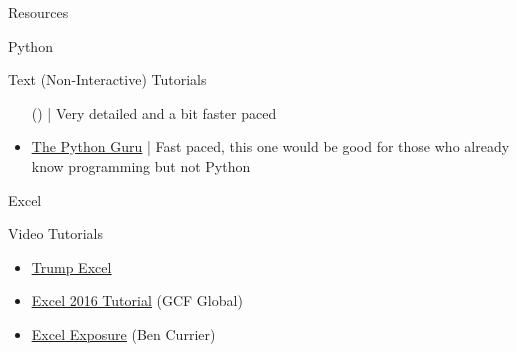 \documentclass[11pt]{resume}
\begin{document}
\begin{section}{Resources}
\begin{subsection}{Python}
\begin{subsubsection}{Text (Non-Interactive) Tutorials}
\begin{itemize}
()
|
Very detailed and a bit faster paced
\item \textcolor{blue}{\underline{\href{https://thepythonguru.com/}{The Python Guru}}}
|
Fast paced, this one would be good for those who already know programming but not Python
\end{itemize}
\end{subsubsection}
\end{subsection}
\begin{subsection}{Excel}
\begin{subsubsection}{Video Tutorials}
\begin{itemize}
\item \textcolor{blue}{\underline{\href{https://trumpexcel.com/learn-excel/}{Trump Excel}}}
\item \textcolor{blue}{\underline{\href{https://edu.gcfglobal.org/en/excel2016/}{Excel 2016 Tutorial}}}
(GCF Global)
\item \textcolor{blue}{\underline{\href{https://excelexposure.com/lesson-guide/}{Excel Exposure}}}
(Ben Currier)
\end{itemize}
\end{subsubsection}
\end{subsection}
\end{section}
\end{document}
